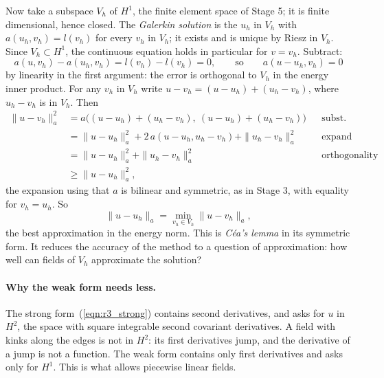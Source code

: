 Now take a subspace $V_h$ of $H^1$, the finite element space of Stage 5; it is finite dimensional, hence closed. The \emph{Galerkin solution} is the $u_h$ in $V_h$ with $a(u_h, v_h) = l(v_h)$ for every $v_h$ in $V_h$; it exists and is unique by Riesz in $V_h$. Since $V_h \subset H^1$, the continuous equation holds in particular for $v = v_h$. Subtract:
\begin{equation*}
a(u, v_h) - a(u_h, v_h) = l(v_h) - l(v_h) = 0, \qquad\text{so}\qquad a(u - u_h, v_h) = 0
\end{equation*}
by linearity in the first argument: the error is orthogonal to $V_h$ in the energy inner product. For any $v_h$ in $V_h$ write $u - v_h = (u - u_h) + (u_h - v_h)$, where $u_h - v_h$ is in $V_h$. Then
\begin{align*}
\|u - v_h\|_a^2 &= a\big((u - u_h) + (u_h - v_h),\ (u - u_h) + (u_h - v_h)\big) && \text{subst.} \\
&= \|u - u_h\|_a^2 + 2\, a(u - u_h, u_h - v_h) + \|u_h - v_h\|_a^2 && \text{expand} \\
&= \|u - u_h\|_a^2 + \|u_h - v_h\|_a^2 && \text{orthogonality} \\
&\ge \|u - u_h\|_a^2 ,
\end{align*}
the expansion using that $a$ is bilinear and symmetric, as in Stage 3, with equality for $v_h = u_h$. So
\begin{equation*}
\|u - u_h\|_a = \min_{v_h \in V_h} \|u - v_h\|_a ,
\end{equation*}
the best approximation in the energy norm. This is \emph{C\'ea's lemma} in its symmetric form. It reduces the accuracy of the method to a question of approximation: how well can fields of $V_h$ approximate the solution?

\paragraph{Why the weak form needs less.} The strong form~(\ref{eqn:r3_strong}) contains second derivatives, and asks for $u$ in $H^2$, the space with square integrable second covariant derivatives. A field with kinks along the edges is not in $H^2$: its first derivatives jump, and the derivative of a jump is not a function. The weak form contains only first derivatives and asks only for $H^1$. This is what allows piecewise linear fields.

